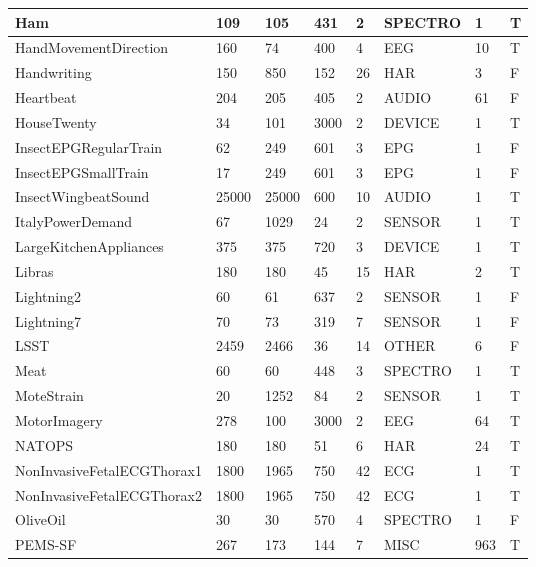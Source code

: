 \begin{landscape}
\begin{longtable}{|*{8}l|}
        \hline
        Ham & 109 & 105 & 431 & 2 & SPECTRO & 1 & T \\
        \hline
        HandMovementDirection & 160 & 74 & 400 & 4 & EEG & 10 & T \\
        \hline
        Handwriting & 150 & 850 & 152 & 26 & HAR & 3 & F \\
        \hline
        Heartbeat & 204 & 205 & 405 & 2 & AUDIO & 61 & F \\
        \hline
        HouseTwenty & 34 & 101 & 3000 & 2 & DEVICE & 1 & T \\
        \hline
        InsectEPGRegularTrain & 62 & 249 & 601 & 3 & EPG & 1 & F \\
        \hline
        InsectEPGSmallTrain & 17 & 249 & 601 & 3 & EPG & 1 & F \\
        \hline
        InsectWingbeatSound & 25000 & 25000 & 600 & 10 & AUDIO & 1 & T \\
        \hline
        ItalyPowerDemand & 67 & 1029 & 24 & 2 & SENSOR & 1 & T \\
        \hline
        LargeKitchenAppliances & 375 & 375 & 720 & 3 & DEVICE & 1 & T \\
        \hline
        Libras & 180 & 180 & 45 & 15 & HAR & 2 & T \\
        \hline
        Lightning2 & 60 & 61 & 637 & 2 & SENSOR & 1 & F \\
        \hline
        Lightning7 & 70 & 73 & 319 & 7 & SENSOR & 1 & F \\
        \hline
        LSST & 2459 & 2466 & 36 & 14 & OTHER & 6 & F \\
        \hline
        Meat & 60 & 60 & 448 & 3 & SPECTRO & 1 & T \\
        \hline
        MoteStrain & 20 & 1252 & 84 & 2 & SENSOR & 1 & T \\
        \hline
        MotorImagery & 278 & 100 & 3000 & 2 & EEG & 64 & T \\
        \hline
        NATOPS & 180 & 180 & 51 & 6 & HAR & 24 & T \\
        \hline
        NonInvasiveFetalECGThorax1 & 1800 & 1965 & 750 & 42 & ECG & 1 & T \\
        \hline
        NonInvasiveFetalECGThorax2 & 1800 & 1965 & 750 & 42 & ECG & 1 & T \\
        \hline
        OliveOil & 30 & 30 & 570 & 4 & SPECTRO & 1 & F \\
        \hline
        PEMS-SF & 267 & 173 & 144 & 7 & MISC & 963 & T \\
        \hline

\end{longtable}
\end{landscape}
